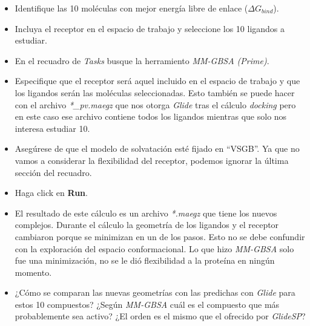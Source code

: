 \documentclass{article}
\begin{document}
\begin{itemize}
    \item Identifique las 10 moléculas con mejor energía libre de enlace ($\Delta G_{bind}$).
    \item Incluya el receptor en el espacio de trabajo y seleccione los 10 ligandos a estudiar. 
    \item En el recuadro de \emph{Tasks} busque la herramiento \emph{MM-GBSA (Prime)}.
    \item Especifique que el receptor será aquel incluido en el espacio de trabajo y que los ligandos serán las moléculas seleccionadas. Esto también se puede hacer con el archivo \emph{*\_pv.maegz} que nos otorga \emph{Glide} tras el cálculo \emph{docking} pero en este caso ese archivo contiene todos los ligandos mientras que solo nos interesa estudiar 10.
    \item Asegúrese de que el modelo de solvatación esté fijado en ``VSGB''. Ya que no vamos a considerar la flexibilidad del receptor, podemos ignorar la última sección del recuadro. 
    \item Haga click en \textbf{Run}.
    \item El resultado de este cálculo es un archivo \emph{*.maegz} que tiene los nuevos complejos. Durante el cálculo la geometría de los ligandos y el receptor cambiaron porque se minimizan en un de los pasos. Esto no se debe confundir con la exploración del espacio conformacional. Lo que hizo \emph{MM-GBSA} solo fue una minimización, no se le dió flexibilidad a la proteína en ningún momento.
    \item ¿Cómo se comparan las nuevas geometrías con las predichas con \emph{Glide} para estos 10 compuestos? ¿Según \emph{MM-GBSA} cuál es el compuesto que más probablemente sea activo? ¿El orden es el mismo que el ofrecido por \emph{GlideSP}?
\end{itemize}
\end{document}
